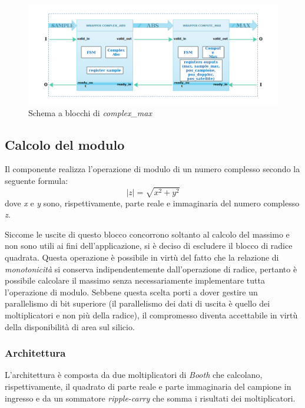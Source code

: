 \documentclass[12pt,a4paper,twoside,openany]{book}
\newcommand\abs[1]{\left|#1\right|}
\begin{document}
\begin{figure}[hb]
\begin{center}
\includegraphics[scale=0.55, keepaspectratio]{immagini/complexmax_schemablocchi}
\caption{Schema a blocchi di \textit{complex\_max}}
\label{complexmax_top}
\end{center}
\end{figure}
\clearpage

\subsection{Calcolo del modulo}
Il componente realizza l'operazione di modulo di un numero complesso secondo la seguente formula:
$$
\abs{z} = \sqrt{x^{2}+y^{2}}
$$
dove \textit{x} e \textit{y} sono, rispettivamente, parte reale e immaginaria del numero complesso \textit{z}.

Siccome le uscite di questo blocco concorrono soltanto al calcolo del massimo e non sono utili ai fini dell'applicazione, si è deciso di escludere il blocco di radice quadrata. Questa operazione è possibile in virtù del fatto che la relazione di \textit{monotonicità} si conserva indipendentemente dall'operazione di radice, pertanto è possibile calcolare il massimo senza necessariamente implementare tutta l'operazione di modulo. Sebbene questa scelta porti a dover gestire un parallelismo di bit superiore (il parallelismo dei dati di uscita è quello dei moltiplicatori e non più della radice), il compromesso diventa accettabile in virtù della disponibilità di area sul silicio.
\subsubsection{Architettura}
L'architettura è composta da due moltiplicatori di \textit{Booth} che calcolano, rispettivamente, il quadrato di parte reale e parte immaginaria del campione in ingresso e da un sommatore \textit{ripple-carry} che somma i risultati dei moltiplicatori.
\end{document}
